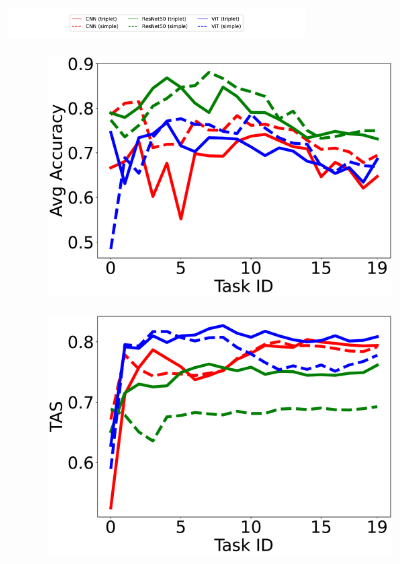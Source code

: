 \begin{figure}
\centering
\includegraphics[width=0.7\textwidth]{imgs/cem/legend.pdf}\\
\begin{subfigure}{.24\textwidth}
\includegraphics[width=\textwidth]{imgs/cem/KANDY_1_avg_accuracy-test.pdf}    
\caption{}
\end{subfigure}
\begin{subfigure}{.24\textwidth}
\includegraphics[width=\textwidth]{imgs/cem/KANDY_1_tas_extended-test.pdf}
\caption{}

\end{subfigure}
\end{figure}

